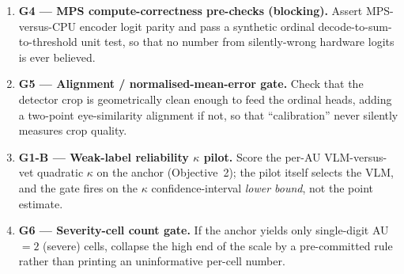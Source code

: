 \begin{enumerate}
    read it---structurally defeating post-hoc goalpost moves.
  \item \textbf{G4 --- MPS compute-correctness pre-checks (blocking).} Assert
    MPS-versus-CPU encoder logit parity and pass a synthetic ordinal
    decode-to-sum-to-threshold unit test, so that no number from silently-wrong
    hardware logits is ever believed.
  \item \textbf{G5 --- Alignment / normalised-mean-error gate.} Check that the
    detector crop is geometrically clean enough to feed the ordinal heads, adding
    a two-point eye-similarity alignment if not, so that ``calibration'' never
    silently measures crop quality.
  \item \textbf{G1-B --- Weak-label reliability $\kappa$ pilot.} Score the per-AU
    VLM-versus-vet quadratic $\kappa$ on the anchor (Objective~2); the pilot itself
    selects the VLM, and the gate fires on the $\kappa$ confidence-interval
    \emph{lower bound}, not the point estimate.
  \item \textbf{G6 --- Severity-cell count gate.} If the anchor yields only
    single-digit AU$=2$ (severe) cells, collapse the high end of the scale by a
    pre-committed rule rather than printing an uninformative per-cell number.
\end{enumerate}

